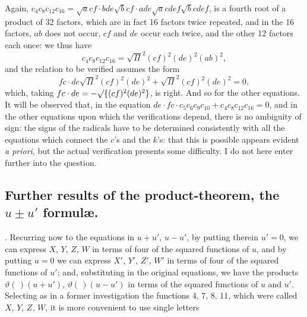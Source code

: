 \documentclass[11pt,a4paper]{book}
\begin{document}
\newpage
\setcounter{page}{555}

Again, $c_4 c_8 c_{12} c_{16} = \surd acf \cdot bde \surd bcf \cdot ade \surd acdef \surd bcdef$, is a fourth root of a product of 32 factors, which are in fact 16 factors twice repeated, and in the 16 factors, $ab$ does not occur, $cf$ and $de$ occur each twice, and the other 12 factors each once: we thus have
\[
c_4 c_8 c_{12} c_{16} = \surd\Pi^2 (cf)^2 (de)^2 (ab)^2,
\]
and the relation to be verified assumes the form
\[
fc \cdot de \surd\Pi^2 (cf)^2 (de)^2 + \surd\Pi^2 (cf)^2 (de)^2 = 0,
\]
which, taking $fc \cdot de = -\surd\{(cf)^2 (de)^2\}$, is right. And so for the other equations. It will be observed that, in the equation $de \cdot fc \cdot c_5 c_6 c_9 c_{10} + c_4 c_8 c_{12} c_{16} = 0$, and in the other equations upon which the verifications depend, there is no ambiguity of sign: the signs of the radicals have to be determined consistently with all the equations which connect the $c$'s and the $k$'s: that this is possible appears evident \textit{a priori}, but the actual verification presents some difficulty. I do not here enter further into the question.

\subsection*{Further results of the product-theorem, the $u \pm u'$ formul\ae.}

. Recurring now to the equations in $u + u'$, $u - u'$, by putting therein $u' = 0$, we can express $X$, $Y$, $Z$, $W$ in terms of four of the squared functions of $u$, and by putting $u = 0$ we can express $X'$, $Y'$, $Z'$, $W'$ in terms of four of the squared functions of $u'$; and, substituting in the original equations, we have the products $\vartheta(\,)(u + u')$, $\vartheta(\,)(u - u')$ in terms of the squared functions of $u$ and $u'$. Selecting as in a former investigation the functions 4, 7, 8, 11, which were called $X$, $Y$, $Z$, $W$, it is more convenient to use single letters
\end{document}
